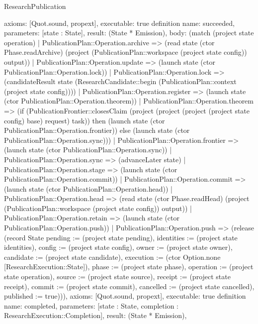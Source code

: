 \begin{lexlean}{ResearchPublication}
\begin{semanticmodule}
{ axioms: [Quot.sound, propext],
 executable: true
}
definition{
 name: succeeded,
 parameters: [state : State],
 result: (State * Emission),
 body: (match (project state operation) | PublicationPlan::Operation.archive => (read state (ctor Phase.readArchive) (project (PublicationPlan::workspace (project state config)) output)) | PublicationPlan::Operation.update => (launch state (ctor PublicationPlan::Operation.lock)) | PublicationPlan::Operation.lock => (candidateResult state (ResearchCandidate::begin (PublicationPlan::context (project state config)))) | PublicationPlan::Operation.register => (launch state (ctor PublicationPlan::Operation.theorem)) | PublicationPlan::Operation.theorem => (if (PublicationFrontier::closesClaim (project (project (project (project state config) base) request) task)) then (launch state (ctor PublicationPlan::Operation.frontier)) else (launch state (ctor PublicationPlan::Operation.sync))) | PublicationPlan::Operation.frontier => (launch state (ctor PublicationPlan::Operation.sync)) | PublicationPlan::Operation.sync => (advanceLater state) | PublicationPlan::Operation.stage => (launch state (ctor PublicationPlan::Operation.commit)) | PublicationPlan::Operation.commit => (launch state (ctor PublicationPlan::Operation.head)) | PublicationPlan::Operation.head => (read state (ctor Phase.readHead) (project (PublicationPlan::workspace (project state config)) output)) | PublicationPlan::Operation.retain => (launch state (ctor PublicationPlan::Operation.push)) | PublicationPlan::Operation.push => (release (record State {pending := (project state pending), identities := (project state identities), config := (project state config), owner := (project state owner), candidate := (project state candidate), execution := (ctor Option.none [ResearchExecution::State]), phase := (project state phase), operation := (project state operation), source := (project state source), receipt := (project state receipt), commit := (project state commit), cancelled := (project state cancelled), published := true}))),
 axioms: [Quot.sound, propext],
 executable: true
}
definition{
 name: completed,
 parameters: [state : State, completion : ResearchExecution::Completion],
 result: (State * Emission),
}
\end{semanticmodule}
\end{lexlean}

